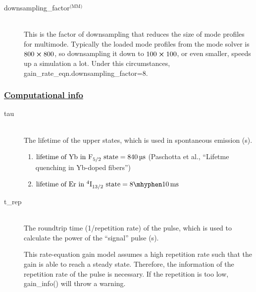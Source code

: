 \documentclass[12pt,hidelinks]{book}
\begin{document}
\begin{description}
\item[downsampling\_factor$^{\text{(MM)}}$]\mbox{}\\
This is the factor of downsampling that reduces the size of mode profiles for multimode. Typically the loaded mode profiles from the mode solver is $800\cross800$, so downsampling it down to $100\cross100$, or even smaller, speeds up a simulation a lot. Under this circumstances, gain\_rate\_eqn.downsampling\_factor=8.
\end{description}

\subsubsection{\underline{Computational info}}
\begin{description}
\item[\color{blue}tau]\mbox{}\\
The lifetime of the upper states, which is used in spontaneous emission (\si{s}).

\begin{enumerate}
\item $\text{lifetime of \ce{Yb} in \ce{F_{5/2}} state}=\SI{840}{\us}$ (Paschotta et al., ``Lifetme quenching in Yb-doped fibers'')
\item $\text{lifetime of \ce{Er} in \ce{{^4}I_{13/2}} state}=\SIrange[range-units=single,range-phrase = \mhyphen]{8}{10}{\ms}$
\end{enumerate}

\item[\color{blue}t\_rep]\mbox{}\\
The roundtrip time (1/repetition rate) of the pulse, which is used to calculate the power of the ``signal'' pulse (\si{\s}).

This rate-equation gain model assumes a high repetition rate such that the gain is able to reach a steady state. Therefore, the information of the repetition rate of the pulse is necessary. If the repetition is too low, gain\_info() will throw a warning.
\end{description}
\end{document}
